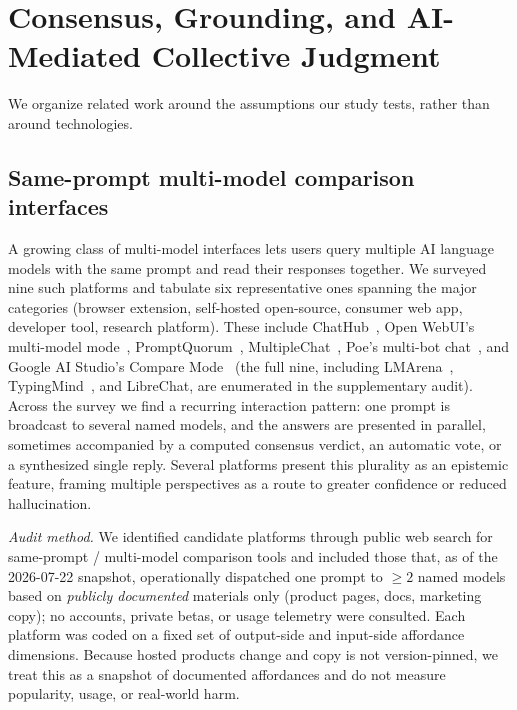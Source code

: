 \documentclass[acmsmall,screen,nonacm]{acmart}
\begin{document}
\section{Consensus, Grounding, and AI-Mediated Collective Judgment}
\label{sec:related}
We organize related work around the assumptions our study tests, rather than around technologies.

\subsection{Same-prompt multi-model comparison interfaces}
\label{sec:interfaces}
A growing class of multi-model interfaces lets users query multiple AI language models with the same prompt
and read their responses together. We surveyed nine such platforms and tabulate six representative
ones spanning the major categories (browser extension, self-hosted open-source, consumer web app, developer
tool, research platform). These include
ChatHub~\cite{chathub2026}, Open WebUI's multi-model mode~\cite{openwebui2026multimodel},
PromptQuorum~\cite{promptquorum2026home,promptquorum2026blog}, MultipleChat~\cite{multiplechat2026},
Poe's multi-bot chat~\cite{poe2024multibot}, and Google AI Studio's Compare
Mode~\cite{googleaistudio2024compare} (the full nine, including LMArena~\cite{lmarena2026},
TypingMind~\cite{typingmind2026}, and LibreChat, are enumerated in the supplementary audit). Across the
survey we find a recurring interaction pattern: one prompt is broadcast to
several named models, and the answers are presented in parallel, sometimes accompanied by a computed
consensus verdict, an automatic vote, or a synthesized single reply. Several platforms present this
plurality as an epistemic feature, framing multiple perspectives as a route to greater confidence or reduced
hallucination.

\emph{Audit method.} We identified candidate platforms through public web search for same-prompt / multi-model
comparison tools and included those that, as of the 2026-07-22 snapshot, operationally dispatched one prompt to
$\ge 2$ named models based on \emph{publicly documented} materials only (product pages, docs, marketing copy);
no accounts, private betas, or usage telemetry were consulted. Each platform was coded on a fixed set of
output-side and input-side affordance dimensions. Because hosted products change and copy is not version-pinned,
we treat this as a snapshot of documented affordances and do not measure popularity, usage, or real-world harm.
\end{document}

